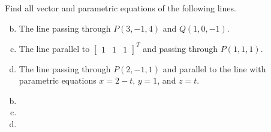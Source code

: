 \documentclass[../main.tex]{subfiles}
\begin{document}
Find all vector and parametric equations of the following lines.
\begin{enumerate}[a)]
	\setcounter{enumi}{1}
	\item The line passing through $P(3, -1, 4)$ and $Q(1, 0, -1)$.
	\setcounter{enumi}{3}
	\item The line parallel to $\begin{bmatrix}1&1&1\end{bmatrix}^T$ and passing through $P(1, 1, 1)$.
	\setcounter{enumi}{5}
	\item The line passing through $P(2, -1, 1)$ and parallel to the line with parametric equations $x = 2 - t$, $y = 1$, and $z = t$.
\end{enumerate}

\solution
\begin{enumerate}[a)]
	\setcounter{enumi}{1}
	\item 
	\setcounter{enumi}{3}
	\item 
	\setcounter{enumi}{5}
	\item 
\end{enumerate}
\end{document}
